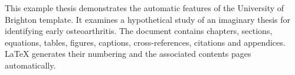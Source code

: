
This example thesis demonstrates the automatic features of the University of
Brighton template. It examines a hypothetical study of an imaginary thesis for identifying early osteoarthritis. The document contains
chapters, sections, equations, tables, figures, captions, cross-references,
citations and appendices. LaTeX generates their numbering and the associated
contents pages automatically.
